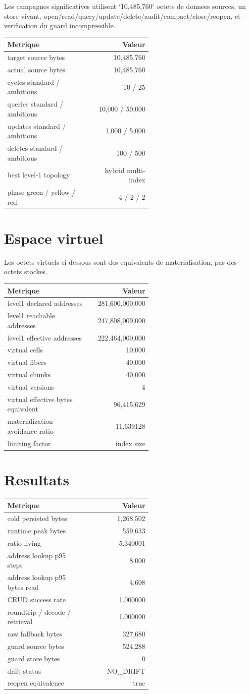\documentclass[a4paper,11pt]{article}
\newcommand{\Metric}[2]{#1 & #2\\}
\begin{document}
Les campagnes significatives utilisent `10,485,760` octets de donnees sources,
un store vivant, open/read/query/update/delete/audit/compact/close/reopen, et
verification du guard incompressible.

\begin{longtable}{@{}p{0.58\linewidth}r@{}}
\toprule
Metrique & Valeur\\
\midrule
\Metric{target source bytes}{10,485,760}
\Metric{actual source bytes}{10,485,760}
\Metric{cycles standard / ambitious}{10 / 25}
\Metric{queries standard / ambitious}{10,000 / 50,000}
\Metric{updates standard / ambitious}{1,000 / 5,000}
\Metric{deletes standard / ambitious}{100 / 500}
\Metric{best level-1 topology}{hybrid multi-index}
\Metric{phase green / yellow / red}{4 / 2 / 2}
\bottomrule
\end{longtable}

\section{Espace virtuel}

Les octets virtuels ci-dessous sont des equivalents de materialisation, pas des
octets stockes.

\begin{longtable}{@{}p{0.58\linewidth}r@{}}
\toprule
Metrique & Valeur\\
\midrule
\Metric{level1 declared addresses}{281,600,000,000}
\Metric{level1 reachable addresses}{247,808,000,000}
\Metric{level1 effective addresses}{222,464,000,000}
\Metric{virtual cells}{10,000}
\Metric{virtual fibers}{40,000}
\Metric{virtual chunks}{40,000}
\Metric{virtual versions}{4}
\Metric{virtual effective bytes equivalent}{96,415,629}
\Metric{materialization avoidance ratio}{11.639128}
\Metric{limiting factor}{index size}
\bottomrule
\end{longtable}

\section{Resultats}

\begin{longtable}{@{}p{0.58\linewidth}r@{}}
\toprule
Metrique & Valeur\\
\midrule
\Metric{cold persisted bytes}{1,268,502}
\Metric{runtime peak bytes}{559,633}
\Metric{ratio living}{5.340001}
\Metric{address lookup p95 steps}{8.000}
\Metric{address lookup p95 bytes read}{4,608}
\Metric{CRUD success rate}{1.000000}
\Metric{roundtrip / decode / retrieval}{1.000000}
\Metric{raw fallback bytes}{327,680}
\Metric{guard source bytes}{524,288}
\Metric{guard store bytes}{0}
\Metric{drift status}{NO\_DRIFT}
\Metric{reopen equivalence}{true}
\bottomrule
\end{longtable}
\end{document}
